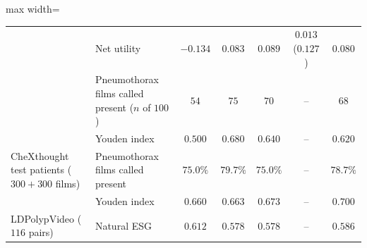\begin{table}[!htbp]
\begin{adjustbox}{max width=\linewidth}
\begin{tabular}{ll ccc c c}
 & Net utility & $-0.134$ & $0.083$ & $0.089$ & $0.013$ ($0.127$) & $0.080$ \\
 & Pneumothorax films called present ($n$ of $100$) & $54$ & $75$ & $70$ & -- & $68$ \\
 & Youden index & $0.500$ & $0.680$ & $0.640$ & -- & $0.620$ \\
\midrule
CheXthought test patients ($300 + 300$ films) & Pneumothorax films called present & $75.0\%$ & $79.7\%$ & $75.0\%$ & -- & $78.7\%$ \\
 & Youden index & $0.660$ & $0.663$ & $0.673$ & -- & $0.700$ \\
\midrule
LDPolypVideo ($116$ pairs) & Natural ESG & $0.612$ & $0.578$ & $0.578$ & -- & $0.586$ \\
\bottomrule
\end{tabular}
\end{adjustbox}
\end{table}

